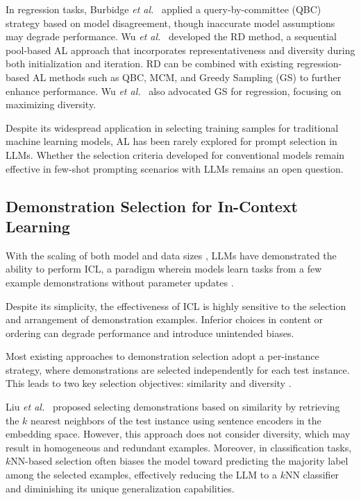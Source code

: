 \documentclass[journal,twocolumn]{IEEEtran}
\begin{document}
In regression tasks, Burbidge \textit{et al.}~\cite{Burbidge2017} applied a query-by-committee (QBC) strategy based on model disagreement, though inaccurate model assumptions may degrade performance. Wu \textit{et al.}~\cite{wu2018pool} developed the RD method, a sequential pool-based AL approach that incorporates representativeness and diversity during both initialization and iteration. RD can be combined with existing regression-based AL methods such as QBC, MCM, and Greedy Sampling (GS) to further enhance performance. Wu \textit{et al.}~\cite{drwuiGS2019} also advocated GS for regression, focusing on maximizing diversity.

Despite its widespread application in selecting training samples for traditional machine learning models, AL has been rarely explored for prompt selection in LLMs. Whether the selection criteria developed for conventional models remain effective in few-shot prompting scenarios with LLMs remains an open question.

\subsection{Demonstration Selection for In-Context Learning}
With the scaling of both model and data sizes \cite{brown2020language, chowdhery2023palm, achiam2023gpt, touvron2023llama}, LLMs have demonstrated the ability to perform ICL, a paradigm wherein models learn tasks from a few example demonstrations without parameter updates \cite{dong-etal-2024-survey}.

Despite its simplicity, the effectiveness of ICL is highly sensitive to the selection and arrangement of demonstration examples. Inferior choices in content or ordering can degrade performance and introduce unintended biases.

Most existing approaches to demonstration selection adopt a per-instance strategy, where demonstrations are selected independently for each test instance. This leads to two key selection objectives: similarity and diversity \cite{luo2024context}.

Liu \textit{et al.}~\cite{liu-etal-2022-makes} proposed selecting demonstrations based on similarity by retrieving the $k$ nearest neighbors of the test instance using sentence encoders in the embedding space. However, this approach does not consider diversity, which may result in homogeneous and redundant examples. Moreover, in classification tasks, $k$NN-based selection often biases the model toward predicting the majority label among the selected examples, effectively reducing the LLM to a $k$NN classifier and diminishing its unique generalization capabilities.
\end{document}
